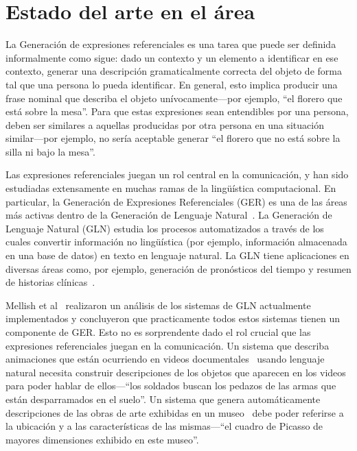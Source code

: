 \section{Estado del arte en el \'area}
\label{intro}

La Generaci\'on de expresiones referenciales es una tarea que puede ser definida informalmente como sigue: dado un contexto y un elemento a identificar en ese contexto, generar una descripci\'on gramaticalmente correcta del objeto de forma tal que una persona lo pueda identificar. En general, esto implica producir una frase nominal que describa el objeto un\'ivocamente---por ejemplo, ``el florero que est\'a sobre la mesa''. Para que estas expresiones sean entendibles por una persona, deben ser similares a aquellas producidas por otra persona en una situaci\'on similar---por ejemplo, no ser\'ia aceptable generar ``el florero que no est\'a sobre la silla ni bajo la mesa''. 

Las expresiones referenciales juegan un rol central en la comunicaci\'on, y han sido estudiadas extensamente en muchas ramas de la ling\"u\'istica computacional. En particular, la Generaci\'on de Expresiones Referenciales (GER) es una de las \'areas m\'as activas dentro de la Generaci\'on de Lenguaje Natural~\cite{KrahmerEmielandVanDeemter2011}. La Generaci\'on de Lenguaje Natural (GLN) estudia los procesos automatizados a trav\'es de los cuales convertir informaci\'on no ling\"u\'istica (por ejemplo, informaci\'on almacenada en una base de datos) en texto en lenguaje natural. La GLN tiene aplicaciones en diversas \'areas como, por ejemplo, generaci\'on de pron\'osticos del tiempo y resumen de historias cl\'inicas~\cite{Reiter2000}. 

Mellish et al~\cite{Mellish2006} realizaron un an\'alisis de los sistemas de GLN actualmente implementados y concluyeron que practicamente todos estos sistemas tienen un componente de GER. Esto no es sorprendente dado el rol crucial que las expresiones referenciales juegan en la comunicaci\'on. Un sistema que describa animaciones que est\'an ocurriendo en videos documentales~\cite{Callaway2005} usando lenguaje natural necesita construir descripciones de los objetos que aparecen en los videos para poder hablar de ellos---``los soldados buscan los pedazos de las armas que est\'an desparramados en el suelo''. Un sistema que genera autom\'aticamente descripciones de las obras de arte exhibidas en un museo~\cite{Cox1999} debe poder referirse a la ubicaci\'on y a las caracter\'isticas de las mismas---``el cuadro de Picasso de mayores dimensiones exhibido en este museo''. 

